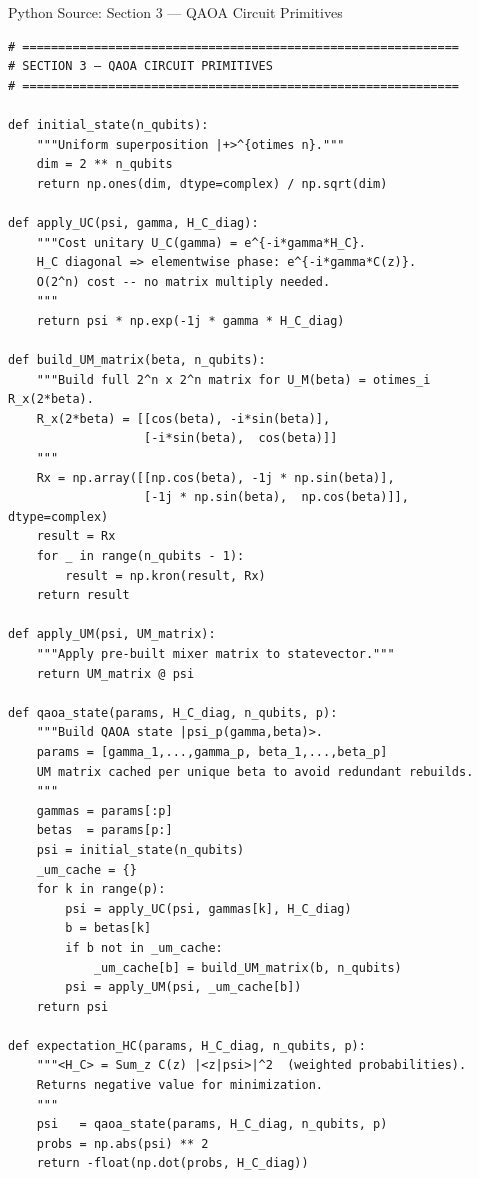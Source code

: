 \documentclass{beamer}
\begin{document}
\begin{frame}{Python Source: Section 3 — QAOA Circuit Primitives}
\footnotesize
\begin{verbatim}
# =============================================================
# SECTION 3 — QAOA CIRCUIT PRIMITIVES
# =============================================================

def initial_state(n_qubits):
    """Uniform superposition |+>^{otimes n}."""
    dim = 2 ** n_qubits
    return np.ones(dim, dtype=complex) / np.sqrt(dim)

def apply_UC(psi, gamma, H_C_diag):
    """Cost unitary U_C(gamma) = e^{-i*gamma*H_C}.
    H_C diagonal => elementwise phase: e^{-i*gamma*C(z)}.
    O(2^n) cost -- no matrix multiply needed.
    """
    return psi * np.exp(-1j * gamma * H_C_diag)

def build_UM_matrix(beta, n_qubits):
    """Build full 2^n x 2^n matrix for U_M(beta) = otimes_i R_x(2*beta).
    R_x(2*beta) = [[cos(beta), -i*sin(beta)],
                   [-i*sin(beta),  cos(beta)]]
    """
    Rx = np.array([[np.cos(beta), -1j * np.sin(beta)],
                   [-1j * np.sin(beta),  np.cos(beta)]], dtype=complex)
    result = Rx
    for _ in range(n_qubits - 1):
        result = np.kron(result, Rx)
    return result

def apply_UM(psi, UM_matrix):
    """Apply pre-built mixer matrix to statevector."""
    return UM_matrix @ psi

def qaoa_state(params, H_C_diag, n_qubits, p):
    """Build QAOA state |psi_p(gamma,beta)>.
    params = [gamma_1,...,gamma_p, beta_1,...,beta_p]
    UM matrix cached per unique beta to avoid redundant rebuilds.
    """
    gammas = params[:p]
    betas  = params[p:]
    psi = initial_state(n_qubits)
    _um_cache = {}
    for k in range(p):
        psi = apply_UC(psi, gammas[k], H_C_diag)
        b = betas[k]
        if b not in _um_cache:
            _um_cache[b] = build_UM_matrix(b, n_qubits)
        psi = apply_UM(psi, _um_cache[b])
    return psi

def expectation_HC(params, H_C_diag, n_qubits, p):
    """<H_C> = Sum_z C(z) |<z|psi>|^2  (weighted probabilities).
    Returns negative value for minimization.
    """
    psi   = qaoa_state(params, H_C_diag, n_qubits, p)
    probs = np.abs(psi) ** 2
    return -float(np.dot(probs, H_C_diag))
\end{verbatim}
\end{frame}

\end{document}
